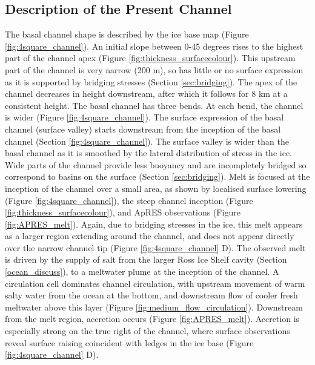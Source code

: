 \subsection{Description of the Present Channel}
The basal channel shape is described by the ice base map (Figure \ref{fig:4square_channel}). An initial slope between 0-45 degrees rises to the highest part of the channel apex (Figure \ref{fig:thickness_surfacecolour}). This upstream part of the channel is very narrow (200 m), so has little or no surface expression as it is supported by bridging stresses (Section \ref{sec:bridging}). The apex of the channel decreases in height downstream, after which it follows for 8 km at a consistent height.
The basal channel has three bends. At each bend, the channel is wider (Figure \ref{fig:4square_channel}).
The surface expression of the basal channel (surface valley) starts downstream from the inception of the basal channel (Section \ref{fig:4square_channel}). The surface valley is wider than the basal channel as it is smoothed by the lateral distribution of stress in the ice. Wide parts of the channel provide less buoyancy and are incompletely bridged so correspond to basins on the surface (Section \ref{sec:bridging}).
Melt is focused at the inception of the channel over a small area, as shown by localised surface lowering (Figure \ref{fig:4square_channel}), the steep channel inception (Figure \ref{fig:thickness_surfacecolour}), and ApRES observations (Figure \ref{fig:APRES_melt}). Again, due to bridging stresses in the ice, this melt appears as a larger region extending around the channel, and does not appear directly over the narrow channel tip  (Figure \ref{fig:4square_channel} D). 
The observed melt is driven by the supply of salt from the larger Ross Ice Shelf cavity (Section \ref{ocean_discuss}), to a meltwater plume at the inception of the channel. A circulation cell dominates channel circulation, with upstream movement of warm salty water from the ocean at the bottom, and downstream flow of cooler fresh meltwater above this layer (Figure \ref{fig:medium_flow_circulation}). 
Downstream from the melt region, accretion occurs (Figure \ref{fig:APRES_melt}).
Accretion is especially strong on the true right of the channel, where surface observations reveal surface raising coincident with ledges in the ice base (Figure \ref{fig:4square_channel} D). 

